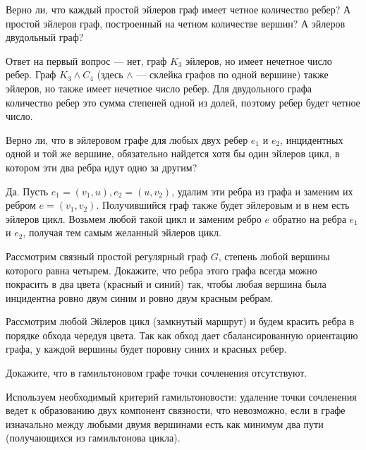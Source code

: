 \documentclass[a4paper,12pt,twoside]{article}
\begin{document}
\begin{?}
    Верно ли, что каждый простой эйлеров граф имеет четное количество ребер? А простой эйлеров граф, построенный на четном количестве вершин? А эйлеров двудольный граф?
\end{?}
\begin{solution}{}
    Ответ на первый вопрос --- нет, граф \(K_3\) эйлеров, но имеет нечетное число ребер. Граф \(K_3 \wedge C_4\) (здесь \(\wedge\) --- склейка графов по одной вершине) также эйлеров, но также имеет нечетное число ребер. Для двудольного графа количество ребер это сумма степеней одной из долей, поэтому ребер будет четное число.
\end{solution}
\begin{?}
    Верно ли, что в эйлеровом графе для любых двух ребер $e_1$ и $e_2$, инцидентных одной и той же вершине, обязательно найдется хотя бы один эйлеров цикл, в котором эти два ребра идут одно за другим?
\end{?}
\begin{solution}{}
    Да. Пусть \(e_1 = (v_1, u), e_2 = (u, v_2)\), удалим эти ребра из графа и заменим их ребром \(e = (v_1, v_2)\). Получившийся граф также будет эйлеровым и в нем есть эйлеров цикл. Возьмем любой такой цикл и заменим ребро \(e\) обратно на ребра \(e_1\) и \(e_2\), получая тем самым желанный эйлеров цикл.
\end{solution}
\begin{?}
    Рассмотрим связный простой регулярный граф $G$, степень любой вершины которого равна четырем. Докажите, что ребра этого графа всегда можно покрасить в два цвета (красный и синий) так, чтобы любая вершина была инцидентна ровно двум синим и ровно двум красным ребрам.
\end{?}
\begin{solution}{}
    Рассмотрим любой Эйлеров цикл (замкнутый маршрут) и будем красить ребра в порядке обхода чередуя цвета. Так как обход дает сбалансированную ориентацию графа, у каждой вершины будет поровну синих и красных ребер. 
\end{solution}
\begin{?}
    Докажите, что в гамильтоновом графе точки сочленения отсутствуют.
\end{?}
\begin{solution}{}
    Используем необходимый критерий гамильтоновости: удаление точки сочленения ведет к образованию двух компонент связности, что невозможно, если в графе изначально между любыми двумя вершинами есть как минимум два пути (получающихся из гамильтонова цикла).
\end{solution}
\end{document}
